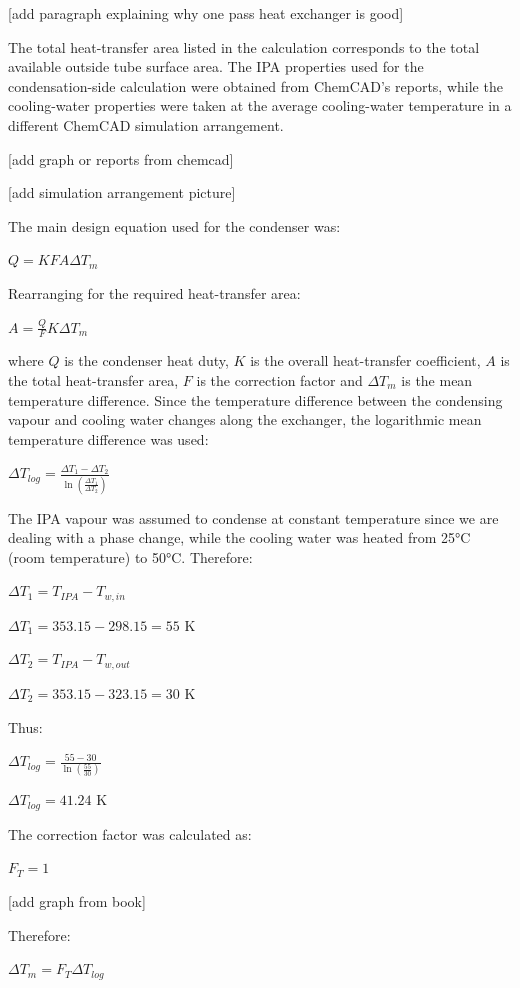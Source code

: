 {[}add paragraph explaining why one pass heat exchanger is good{]}

The total heat-transfer area listed in the calculation corresponds to
the total available outside tube surface area. The IPA properties used
for the condensation-side calculation were obtained from ChemCAD's
reports, while the cooling-water properties were taken at the average
cooling-water temperature in a different ChemCAD simulation arrangement.

{[}add graph or reports from chemcad{]}

{[}add simulation arrangement picture{]}

The main design equation used for the condenser was:

\(Q = K F A \Delta T_m\)

Rearranging for the required heat-transfer area:

\(A = \frac{Q}{F}{K \Delta T_m}\)

where \(Q\) is the condenser heat duty, \(K\) is the overall
heat-transfer coefficient, \(A\) is the total heat-transfer area, \(F\)
is the correction factor and \(\Delta T_m\) is the mean temperature
difference. Since the temperature difference between the condensing
vapour and cooling water changes along the exchanger, the logarithmic
mean temperature difference was used:

\(\Delta T_{log} = \frac{\Delta T_1 - \Delta T_2}{\ln \left(\frac{\Delta T_1}{\Delta T_2}\right)}\)

The IPA vapour was assumed to condense at constant temperature since we
are dealing with a phase change, while the cooling water was heated from
25°C (room temperature) to 50°C. Therefore:

\(\Delta T_1 = T_{IPA} - T_{w,in}\)

\(\Delta T_1 = 353.15 - 298.15 = 55 \text{ K}\)

\(\Delta T_2 = T_{IPA} - T_{w,out}\)

\(\Delta T_2 = 353.15 - 323.15 = 30 \text{ K}\)

Thus:

\(\Delta T_{log} = \frac{55 - 30}{\ln \left(\frac{55}{30}\right)}\)

\(\Delta T_{log} = 41.24 \text{ K}\)

The correction factor was calculated as:

\(F_T = 1\)

{[}add graph from book{]}

Therefore:

\(\Delta T_m = F_T \Delta T_{log}\)

